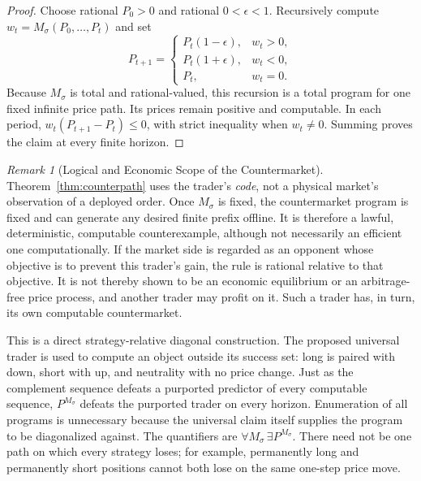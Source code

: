 \documentclass[aps,pra,reprint,superscriptaddress,amsmath,amssymb,floatfix]{revtex4-2}
\theoremstyle{plain}
\theoremstyle{definition}
\theoremstyle{remark}
\newtheorem{remark}{Remark}
\begin{document}
\begin{proof}
Choose rational \(P_0>0\) and rational \(0<\epsilon<1\). Recursively compute
\(w_t=M_\sigma(P_0,\ldots,P_t)\) and set
\begin{equation}
P_{t+1}=
\begin{cases}
P_t(1-\epsilon),&w_t>0,\\
P_t(1+\epsilon),&w_t<0,\\
P_t,&w_t=0.
\end{cases}
\label{eq:adversary}
\end{equation}
Because \(M_\sigma\) is total and rational-valued, this recursion is a total
program for one fixed infinite price path. Its prices remain positive and
computable. In each period,
\(w_t(P_{t+1}-P_t)\leq0\), with strict inequality when \(w_t\neq0\).
Summing proves the claim at every finite horizon.
\end{proof}

\begin{remark}[Logical and Economic Scope of the Countermarket]
\label{rem:counterpath-scope}
Theorem~\ref{thm:counterpath} uses the trader's \emph{code}, not a physical
market's observation of a deployed order. Once \(M_\sigma\) is fixed, the
countermarket program is fixed and can generate any desired finite prefix
offline. It is therefore a lawful, deterministic, computable counterexample,
although not necessarily an efficient one computationally. If the market side
is regarded as an opponent whose objective is to prevent this trader's gain,
the rule is rational relative to that objective. It is not thereby shown to be
an economic equilibrium or an arbitrage-free price process, and another trader
may profit on it. Such a trader has, in turn, its own computable countermarket.
\end{remark}

This is a direct strategy-relative diagonal construction. The proposed
universal trader is used to compute an object outside its success set: long is
paired with down, short with up, and neutrality with no price change. Just as
the complement sequence defeats a purported predictor of every computable
sequence, \(P^{M_\sigma}\) defeats the purported trader on every horizon.
Enumeration of all programs is unnecessary because the universal claim itself
supplies the program to be diagonalized against. The quantifiers are
\(\forall M_\sigma\,\exists P^{M_\sigma}\). There need not be one path on
which every strategy loses; for example, permanently long and permanently
short positions cannot both lose on the same one-step price move.
\end{document}
